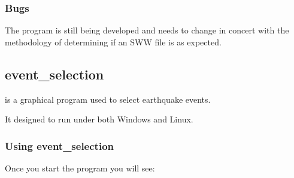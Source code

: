 \documentclass{manual}
\begin{document}
\subsubsection{Bugs}
\label{subsubsec:cmpsww_bugs}

The  program is still being developed and needs to change in concert
with the methodology of determining if an SWW file is as expected.

\pagebreak

\subsection{event_selection}
\label{subsec:event_selection}

 is a graphical program used to select earthquake events.

It designed to run under both Windows and Linux.

\subsubsection{Using event_selection}
\label{subsubsec:event_selection_use}

Once you start the  program you will see:
\end{document}
